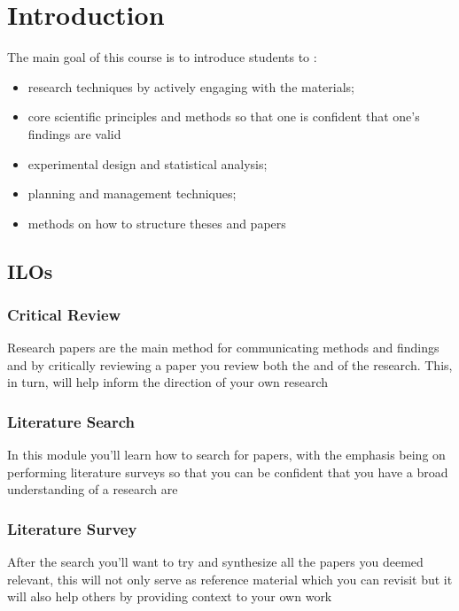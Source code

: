 \section{Introduction}

    \par{The main goal of this course is to introduce students to :}
        \begin{itemize}
            \item {} research techniques by actively engaging with the materials;
            \item core scientific principles and methods so that one is confident that one's
findings are valid
            \item experimental design and statistical analysis;
            \item planning and management techniques;
            \item methods on how to structure theses and papers
        \end{itemize}
\subsection{ILOs}
    \subsubsection{Critical Review}
        \par{Research papers are the main method for communicating methods and findings and by
critically reviewing a paper you review both the  and  of the research.
This, in turn, will help inform the direction of your own research}

    \subsubsection{Literature Search}
        \par{In this module you'll learn how to search for  papers, with the emphasis
being on performing  literature surveys so that you can be confident that you
have a broad understanding of a research are}

    \subsubsection{Literature Survey}
        \par{After the search you'll want to try and synthesize all the papers you deemed relevant,
this will not only serve as reference material which you can revisit but it will also help others by
providing context to your own work}


